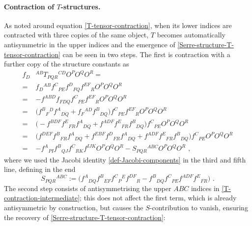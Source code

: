 \documentclass[12pt]{article}
\numberwithin{equation}{section}
\begin{document}
\paragraph{Contraction of $T$-structures.} As noted around equation \eqref{T-tensor-contraction}, when its lower indices are contracted with three copies of the same object, $T$ becomes automatically antisymmetric in the upper indices and the emergence of \eqref{Serre-structure-T-tensor-contraction} can be seen in two steps. The first is contraction with a further copy of the structure constants as
\begin{equation}\label{T-contraction-intermediate}
\begin{aligned}
f_{D}&{}^{AB}T_{PQR}{}^{CD}O^{P}O^{Q}O^{R}=
\\
=&f_{D}{}^{AB}f^{C}{}_{PE}f^{D}{}_{FQ}f^{EF}{}_{R}O^{P}O^{Q}O^{R}
\\
=&-f^{ABD}f_{FDQ}f^{C}{}_{PE}f^{EF}{}_{R}O^{P}O^{Q}O^{R}
\\
=& \bigl( f^{B}{}_{F}{}^{D}f^{A}{}_{DQ}+f_{F}{}^{AD}f^{B}{}_{DQ} \bigr) f^{C}{}_{PE}f^{EF}{}_{R}O^{P}O^{Q}O^{R}
\\
=&\bigl( -f^{BDF}f^{E}{}_{FR}f^{A}{}_{DQ}+f^{ADF}f^{E}{}_{FR}f^{B}{}_{DQ} \bigr) f^{C}{}_{PE}O^{P}O^{Q}O^{R}
\\
=&\bigl( f^{DEF}f^{B}{}_{FR}f^{A}{}_{DQ}+f^{EBF}f^{D}{}_{FR}f^{A}{}_{DQ}+f^{ADF}f^{E}{}_{FR}f^{B}{}_{DQ} \bigr) f^{C}{}_{PE}O^{P}O^{Q}O^{R}
\\
=& -f^{A}{}_{PI}f^{B}{}_{QJ}f^{C}{}_{RK}f^{IJK}O^{P}O^{Q}O^{R} - S_{PQR}{}^{ABC}O^{P}O^{Q}O^{R} \,\, ,
\end{aligned}
\end{equation}
where we used the Jacobi identity \eqref{def-Jacobi-components} in the third and fifth line, defining in the end
\begin{equation}
S_{PQR}{}^{ABC}:=\bigl(f^{A}{}_{DQ}f^{B}{}_{EF}f^{C}{}_{P}{}^{E}f^{DF}{}_{R}-f^{B}{}_{DQ}f^{C}{}_{PE}f^{ADF}f^{E}{}_{FR} \bigr) \,\, .
\end{equation}
The second step consists of antisymmetrising the upper $ABC$ indices in \eqref{T-contraction-intermediate}; this does not affect the first term, which is already antisymmetric by construction, but causes the $S$-contribution to vanish, ensuring the recovery of \eqref{Serre-structure-T-tensor-contraction}:
\end{document}
